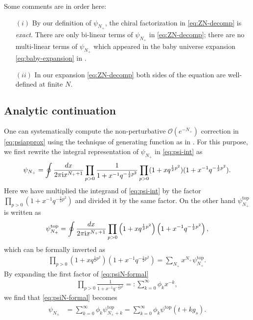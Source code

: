 \documentclass[11pt]{article}
\newcommand{\ri}{{\rm i}}
\newcommand{\hf}{\frac{1}{2}}
\renewcommand{\[}{\begin{eqnarray}}
\renewcommand{\]}{\end{eqnarray}}
\begin{document}
Some comments are in order here:
\begin{itemize}
 \item[$(i)$] 
By our definition of $\psi_{N_+}$, the chiral factorization in \eqref{eq:ZN-decomp}
is {\it exact}. There are only bi-linear terms of $\psi_{N_+}$ in \eqref{eq:ZN-decomp};
there are no multi-linear terms of $\psi_{N_+}$
which appeared in the baby universe expansion \eqref{eq:baby-expansion} in \cite{Dijkgraaf:2005bp}.
\item[$(ii)$]
In our expansion \eqref{eq:ZN-decomp} both sides of the equation are well-defined
at finite $N$.
\end{itemize}

\subsection{Analytic continuation}
One can systematically compute the non-perturbative $\mathcal{O}(e^{-N_+})$ 
correction in \eqref{eq:psiapprox}
using the technique of generating function 
as in \cite{Dijkgraaf:2005bp}.
For this purpose, we first rewrite the integral representation of $\psi_{N_+}$ in \eqref{eq:psi-int} 
as
\begin{align}
 \psi_{N_+}=\oint\frac{dx}{2\pi\ri x^{N_++1}}\prod_{p>0}\frac{1}{1+x^{-1}q^{-\hf p^2}}
\prod_{p>0}(1+xq^{\hf p^2})(1+x^{-1}q^{-\hf p^2}). 
\label{eq:psiN-formal}
\end{align}
Here we have multiplied the integrand of \eqref{eq:psi-int}
by the factor
$\prod_{p>0}(1+x^{-1}q^{-\hf p^2})$ and divided it by the same factor.
On the other hand $\psi^{\text{top}}_{N_+}$ is written as \cite{Dijkgraaf:2005bp}
\begin{align}
 \psi_{N_+}^{\text{top}}=\oint\frac{dx}{2\pi\ri x^{N_++1}}
 \prod_{p>0}\left(1+x q^{\hf p^2}\right)
            \left(1+x^{-1} q^{-\hf p^2}\right),
\label{eq:top-int}
\end{align}
which can be formally inverted as
\begin{align}
\prod_{p>0}(1+xq^{\hf p^2})(1+x^{-1}q^{-\hf p^2}) =
\sum_{N_+} x^{N_+} \psi_{N_+}^{\text{top}}.
\end{align} 
By expanding the first factor of \eqref{eq:psiN-formal}
\begin{align}
 \prod_{p>0}\frac{1}{1+x^{-1}q^{-\hf p^2}}=:\sum_{k=0}^\infty \phi_kx^{-k},
\label{eq:phi-gen}
\end{align}
we find that \eqref{eq:psiN-formal} becomes
\begin{align}
\begin{aligned}
 \psi_{N_+}
&=\sum_{k=0}^\infty \phi_k\psi_{N_++k}^{\text{top}}
= \sum_{k=0}^\infty \phi_k\psi^{\text{top}}(t+kg_s).
\label{eq:phiN-exp}
\end{aligned}
\end{align}
\end{document}
